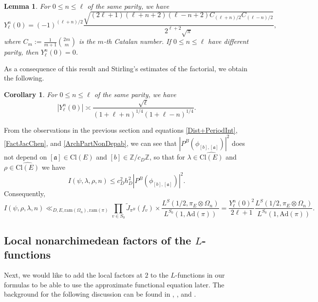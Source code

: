 \documentclass[11pt]{amsart}
\newcommand{\Z}{\mathbb{Z}}
\renewcommand{\a}{\mathfrak{a}}
\newtheorem{corollary}[theorem]{Corollary}
\newtheorem{lemma}[theorem]{Lemma}
\theoremstyle{definition}
\theoremstyle{remark}
\begin{document}
\begin{lemma}\label{ValueYkn0}
For $0\leq n\leq \ell$ of the same parity, we have $$ Y_{\ell}^{n}(0) = (-1)^{(\ell+n)/2} \frac{\sqrt{(2\ell+1)(\ell+n+2)(\ell-n+2) C_{(\ell+n)/2} C_{(\ell-n)/2}}}{2^{\ell+2}\sqrt{\pi}},$$ where $C_m := \frac{1}{m+1} \binom{2m}{m}$ is the $m$-th Catalan number. If $0\leq n\leq \ell$ have different parity, then $Y_{\ell}^{n}(0)=0$.
\end{lemma}

As a consequence of this result and Stirling's estimates of the factorial, we obtain the following.

\begin{corollary}\label{EstimateArchimFactor}
For $0\leq n\leq \ell$ of the same parity, we have $$ |Y_{\ell}^{n}(0)| \asymp \frac{\sqrt{\ell}}{(1+\ell+n)^{1/4} (1+\ell-n)^{1/4}}.$$
\end{corollary}

From the observations in the previous section and equations \eqref{Dist+PeriodInt}, \eqref{FactJacChen}, and \eqref{ArchPartNonDepab}, we can see that $|P^{B}(\phi_{[b],[\a]})|^2$ does not depend on $[\a] \in \mathrm{Cl}(E)$ and $[b]\in \Z/c_D \Z$, so that for $\lambda \in \widehat{\mathrm{Cl}(E)}$ and $\rho\in \widehat{\mathrm{Cl}(E)}$ we have $$ I(\psi, \lambda, \rho, n) \leq c_{D}^2 h_{D}^2 |P^{B}(\phi_{[b],[\a]})|^2.$$ Consequently,
\begin{equation}
    I(\psi,\rho,\lambda,n) \ll_{D,E,\mathrm{ram}(\Omega_n),\mathrm{ram}(\pi)} \prod_{v\in S_0} \tilde{J}_{\pi^B}(f_v) \times \frac{L^{S}(1/2, \pi_E \otimes \Omega_n)}{L^{S_0}(1,\mathrm{Ad}(\pi))} = \frac{Y_{\ell}^{n}(0)^2}{2\ell+1} \frac{L^{S}(1/2, \pi_E \otimes \Omega_n)}{L^{S_0}(1,\mathrm{Ad}(\pi))}. \label{PeriodIntToLvalues}
\end{equation}




\subsection{Local nonarchimedean factors of the \texorpdfstring{$L$}{L}-functions}

Next, we would like to add the local factors at $2$ to the $L$-functions in our formulas to be able to use the approximate functional equation later. The background for the following discussion can be found in \cite{NTBTate}, \cite[\S 1]{IntroLanglands}, and \cite[\S 7]{localLanglandsGL2}.
\end{document}
